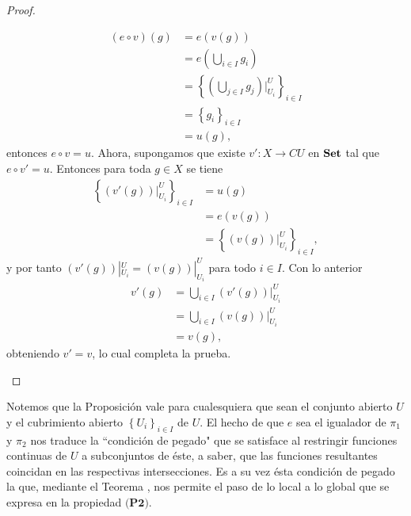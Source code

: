 \begin{proof}
\begin{itemize}
$$\begin{aligned}
            (e\circ v)(g)&=e(v(g))\\
                         &=e(\bigcup_{i\in I}g_i)\\
                         &=\left\lbrace (\bigcup_{j\in I}g_j)|^U_{U_i}\right\rbrace_{i\in I}\\
                         &=\left\lbrace g_i\right\rbrace_{i\in I}\\
                         &=u(g),
         \end{aligned}
         $$
         entonces $e\circ v=u$. Ahora, supongamos que existe $v':X\to CU$ en $\normalfont{\textbf{Set}}$ tal que $e\circ v'=u$. Entonces para toda $g\in X$ se tiene
         $$
         \begin{aligned}
            \left\lbrace (v'(g))|^U_{U_i}\right\rbrace_{i\in I}&=u(g)\\
                                                               &=e(v(g))\\
                                                               &=\left\lbrace (v(g))|^U_{U_i}\right\rbrace_{i\in I},
         \end{aligned}
         $$
         y por tanto $(v'(g))|^U_{U_i}=(v(g))|^U_{U_i}$ para todo $i\in I$. Con lo anterior
         $$
         \begin{aligned}
            v'(g)&=\bigcup_{i\in I}(v'(g))|^U_{U_i}\\
                 &=\bigcup_{i\in I}(v(g))|^U_{U_i}\\
                 &=v(g),
         \end{aligned}
         $$
         obteniendo $v'=v$, lo cual completa la prueba.  
   \end{itemize}
\end{proof}
Notemos que la Proposición  vale para cualesquiera que sean el conjunto abierto $U$ y el cubrimiento abierto $\left\lbrace U_i\right\rbrace_{i\in I}$ de $U$. El hecho de que $e$ sea el igualador de $\pi_1$ y $\pi_2$ nos traduce la ``condición de pegado" que se satisface al restringir funciones continuas de $U$ a subconjuntos de éste, a saber, que las funciones resultantes coincidan en las respectivas intersecciones. Es a su vez ésta condición de pegado la que, mediante el Teorema , nos permite el paso de lo local a lo global que se expresa en la propiedad $\textbf{(P2)}$. 
